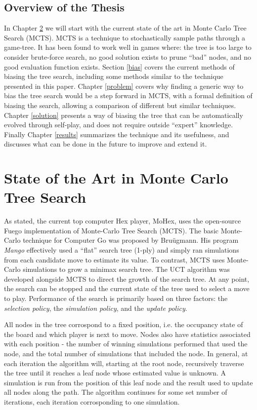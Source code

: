 \documentclass[10pt,a4paper]{report}
\begin{document}
\section{Overview of the Thesis}\label{overview}
In Chapter \ref{mcts} we will start with the current state of the art in Monte Carlo Tree Search (MCTS). MCTS is a technique to stochastically sample paths through a game-tree. It has been found to work well in games where: the tree is too large to consider brute-force search, no good solution exists to prune ``bad'' nodes, and no good evaluation function exists. Section \ref{bias} covers the current methods of biasing the tree search, including some methods similar to the technique presented in this paper. Chapter \ref{problem} covers why finding a generic way to bias the tree search would be a step forward in MCTS, with a formal definition of biasing the search, allowing a comparison of different but similar techniques. Chapter \ref{solution} presents a way of biasing the tree that can be automatically evolved through self-play, and does not require outside ``expert'' knowledge. Finally Chapter \ref{results} summarizes the technique and its usefulness, and discusses what can be done in the future to improve and extend it.

\chapter{State of the Art in Monte Carlo Tree Search}\label{mcts}
As stated, the current top computer Hex player, MoHex, uses the open-source Fuego implementation of Monte-Carlo Tree Search (MCTS). The basic Monte-Carlo technique for Computer Go was proposed by Bru\"{u}gmann\cite{brugmann1993monte}. His program \emph{Mango} effectively used a ``flat'' search tree (1-ply) and simply ran simulations from each candidate move to estimate its value. To contrast, MCTS uses Monte-Carlo simulations to grow a minimax search tree. The UCT algorithm was developed alongside MCTS to direct the growth of the search tree\cite{gelly2006exploration}. At any point, the search can be stopped and the current state of the tree used to select a move to play. Performance of the search is primarily based on three factors: the \emph{selection policy}, the \emph{simulation policy}, and the \emph{update policy}.

All nodes in the tree corrospond to a fixed position, i.e. the occupancy state of the board and which player is next to move. Nodes also have statistics associated with each position - the number of winning simulations performed that used the node, and the total number of simulations that included the node. In general, at each iteration the algorithm will, starting at the root node, recursively traverse the tree until it reaches a leaf node whose estimated value is unknown. A simulation is run from the position of this leaf node and the result used to update all nodes along the path. The algorithm continues for some set number of iterations, each iteration corrosponding to one simulation.
\end{document}
